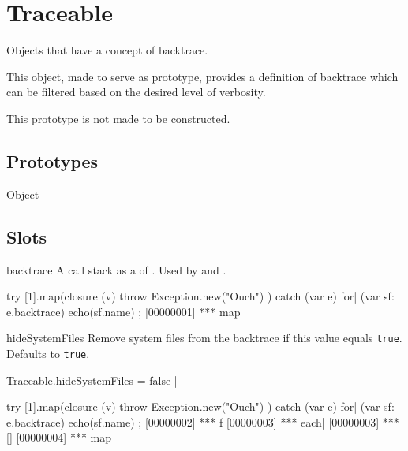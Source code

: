 
\section{Traceable}
Objects that have a concept of backtrace.

This object, made to serve as prototype, provides a definition of backtrace
which can be filtered based on the desired level of verbosity.

This prototype is not made to be constructed.

\subsection{Prototypes}
\begin{refObjects}
\item[Object]
\end{refObjects}

\subsection{Slots}

\begin{urbiscriptapi}
\item[backtrace] A call stack as a  of
  .  Used by  and
  .
\begin{urbiscript}
try
{
  [1].map(closure (v) { throw Exception.new("Ouch") })
}
catch (var e)
{
  for| (var sf: e.backtrace)
    echo(sf.name)
};
[00000001] *** map
\end{urbiscript}


\item[hideSystemFiles] Remove system files from the backtrace if this value
  equals \lstinline|true|.  Defaults to \lstinline|true|.
\begin{urbiscript}
Traceable.hideSystemFiles = false |

try
{
  [1].map(closure (v) { throw Exception.new("Ouch") })
}
catch (var e)
{
  for| (var sf: e.backtrace)
    echo(sf.name)
};
[00000002] *** f
[00000003] *** each|
[00000003] *** []
[00000004] *** map
\end{urbiscript}
\end{urbiscriptapi}



